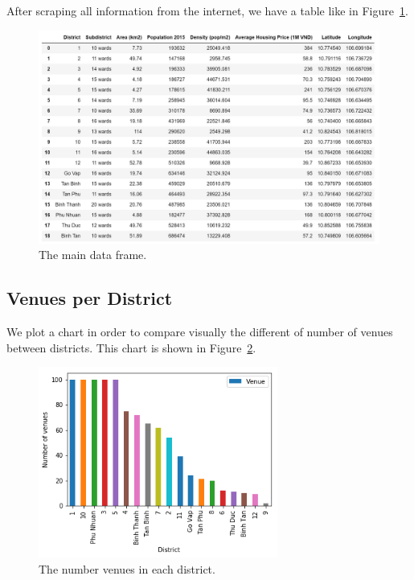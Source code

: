 \documentclass[12pt,a4paper]{article}
\begin{document}
After scraping all information from the internet, we have a table like in Figure~\ref{fig:df}.

\begin{center}
    \begin{figure}[htp]
    \begin{center}
     \includegraphics[width=\textwidth]{fig/df}
    \end{center}
    \caption{The main data frame.}
    \label{fig:df}
    \end{figure}
\end{center}

\subsection{Venues per District}

We plot a chart in order to compare visually the different of number of venues between districts. This chart is shown in Figure~\ref{fig:ve-per-dis}.

\begin{center}
    \begin{figure}[htp]
    \begin{center}
     \includegraphics[width=0.7\textwidth]{fig/venues-per-district}
    \end{center}
    \caption{The number venues in each district.}
    \label{fig:ve-per-dis}
    \end{figure}
\end{center}
\end{document}
